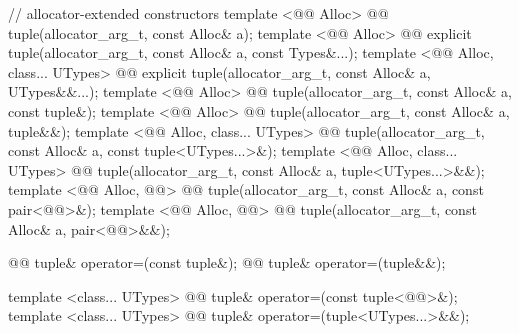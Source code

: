 \documentclass[american,twoside]{book}
\begin{document}
\begin{codeblock}
{  // allocator-extended constructors
  template <@@ Alloc>
    @@ 
    tuple(allocator_arg_t, const Alloc& a);
  template <@@ Alloc>
    @@ 
    explicit tuple(allocator_arg_t, const Alloc& a, const Types&...);
  template <@@ Alloc, class... UTypes>
    @@
    explicit tuple(allocator_arg_t, const Alloc& a, UTypes&&...);
  template <@@ Alloc>
    @@ 
    tuple(allocator_arg_t, const Alloc& a, const tuple&);
  template <@@ Alloc>
    @@ 
    tuple(allocator_arg_t, const Alloc& a, tuple&&);
  template <@@ Alloc, class... UTypes>
    @@
    tuple(allocator_arg_t, const Alloc& a, const tuple<UTypes...>&);
  template <@@ Alloc, class... UTypes>
    @@
    tuple(allocator_arg_t, const Alloc& a, tuple<UTypes...>&&);
  template <@@ Alloc, @@>
    @@
    tuple(allocator_arg_t, const Alloc& a, const pair<@@>&);
  template <@@ Alloc, @@>
    @@
    tuple(allocator_arg_t, const Alloc& a, pair<@@>&&);

  @@ tuple& operator=(const tuple&);
  @@ tuple& operator=(tuple&&);

  template <class... UTypes>
    @@ 
    tuple& operator=(const tuple<@@>&);
  template <class... UTypes>
    @@ 
    tuple& operator=(tuple<UTypes...>&&);

}
\end{codeblock}
\end{document}
